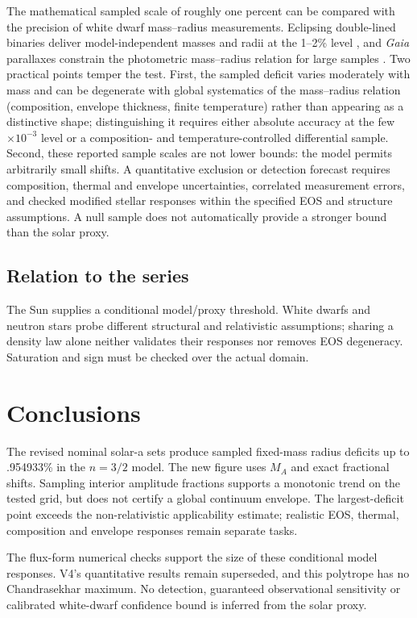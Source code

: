 \documentclass[twocolumn,prd,superscriptaddress,nofootinbib]{revtex4-2}
\begin{document}
The mathematical sampled scale of roughly one percent can be compared with the precision of
white dwarf mass--radius measurements. Eclipsing double-lined binaries
deliver model-independent masses and radii at the 1--2\% level
\cite{Parsons2017}, and \emph{Gaia} parallaxes constrain the
photometric mass--radius relation for large samples
\cite{Tremblay2017,Fontaine2001}. Two practical points temper the test.
First, the sampled deficit varies moderately with mass and can be
degenerate with global systematics of the mass--radius relation
(composition, envelope thickness, finite temperature) rather than
appearing as a distinctive shape; distinguishing it requires either
absolute accuracy at the few$\times10^{-3}$ level or a composition- and
temperature-controlled differential sample. Second, these reported sample scales are not lower bounds: the model
permits arbitrarily small shifts.
A quantitative exclusion or detection forecast requires composition,
thermal and envelope uncertainties, correlated measurement errors, and
checked modified stellar responses within the specified EOS and structure assumptions. A null sample does not automatically
provide a stronger bound than the solar proxy.

\subsection{Relation to the series}

The Sun supplies a conditional model/proxy threshold. White dwarfs
and neutron stars probe different structural and relativistic assumptions;
sharing a density law alone neither validates their responses nor removes
EOS degeneracy. Saturation and sign must be checked over the actual domain.

\section{Conclusions}
The revised nominal solar-a sets produce sampled fixed-mass radius deficits
up to .954933\% in the $n=3/2$ model. The new figure uses $M_A$ and exact
fractional shifts. Sampling interior amplitude fractions supports a monotonic
trend on the tested grid, but does not certify a global continuum envelope.
The largest-deficit point exceeds the non-relativistic applicability estimate;
realistic EOS, thermal, composition and envelope responses remain separate tasks.

The flux-form numerical checks support the size of these conditional model
responses. V4's quantitative results remain superseded, and this polytrope
has no Chandrasekhar maximum. No detection, guaranteed observational sensitivity
or calibrated white-dwarf confidence bound is inferred from the solar proxy.
\end{document}
